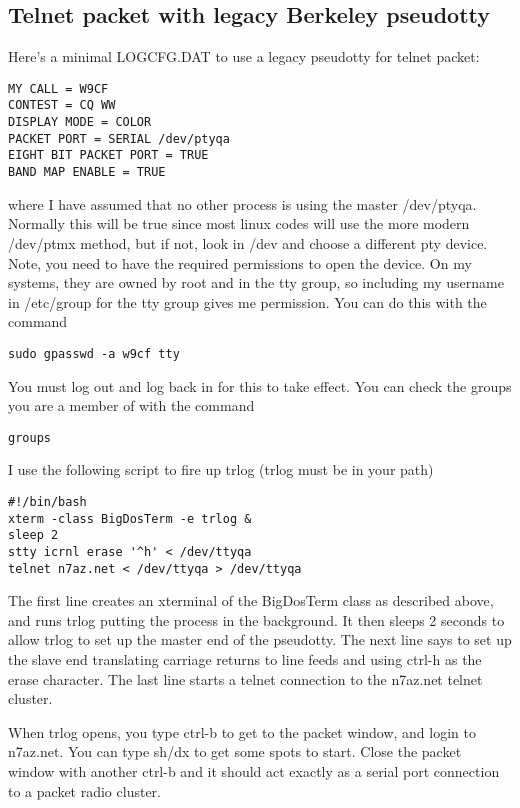 \documentclass[12pt]{article}
\begin{document}
\subsection{Telnet packet with legacy Berkeley pseudotty}
Here's a minimal LOGCFG.DAT to use a legacy pseudotty for telnet packet:
\begin{verbatim}
MY CALL = W9CF
CONTEST = CQ WW
DISPLAY MODE = COLOR
PACKET PORT = SERIAL /dev/ptyqa
EIGHT BIT PACKET PORT = TRUE
BAND MAP ENABLE = TRUE
\end{verbatim}
where I have assumed that no other process is using the master /dev/ptyqa.
Normally this will be true since most linux codes will use the more
modern /dev/ptmx method, but if not, look in /dev and choose a different
pty device. Note, you need to have the required permissions to open the
device. On my systems, they are owned by root and in the tty group, so
including my username in /etc/group for the tty group gives me permission.
You can do this with the command
\begin{verbatim}
sudo gpasswd -a w9cf tty
\end{verbatim}
You must log out and log back in for this to take effect. You can check
the groups you are a member of with the command
\begin{verbatim}
groups
\end{verbatim}

I use the following script to fire up trlog (trlog must be in your path)
\begin{verbatim}
#!/bin/bash
xterm -class BigDosTerm -e trlog &
sleep 2
stty icrnl erase '^h' < /dev/ttyqa
telnet n7az.net < /dev/ttyqa > /dev/ttyqa
\end{verbatim}
The first line creates an xterminal of the BigDosTerm class as described
above, and runs trlog putting the process in the background.
It then sleeps 2 seconds to allow trlog to set up the master end of the
pseudotty. The next line says to set up the slave end translating
carriage returns to line feeds and using ctrl-h as the erase character.
The last line starts a telnet connection to the n7az.net telnet cluster.

When trlog opens, you type ctrl-b to get to the packet window, and login
to n7az.net. You can type sh/dx to get some spots to start. Close the
packet window with another ctrl-b and it should act exactly as a serial
port connection to a packet radio cluster.
\end{document}
